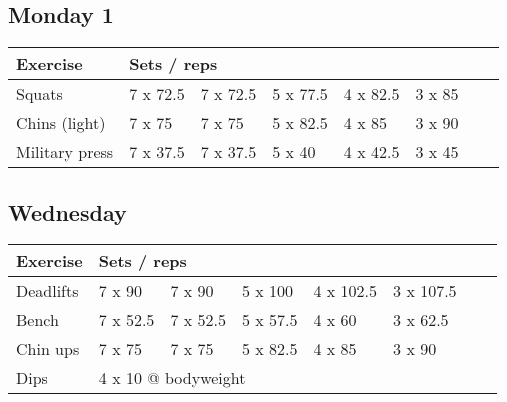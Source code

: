 \documentclass[12pt, a4paper]{article}%
\begin{document}
  \subsection*{\hspace{0.5em} Monday 1 }


  \begin{tabular}{l|lllllll}
  \hspace{0.75em} \textbf{Exercise} & \multicolumn{ 7 }{l}{ \textbf{Sets / reps} } \\ \hline

            \hspace{0.75em} Squats
            & 7 x 72.5
            & 7 x 72.5
            & 5 x 77.5
            & 4 x 82.5
            & 3 x 85
            & 
            & 
            \\


            \hspace{0.75em} Chins (light)
            & 7 x 75
            & 7 x 75
            & 5 x 82.5
            & 4 x 85
            & 3 x 90
            & 
            & 
            \\


            \hspace{0.75em} Military press
            & 7 x 37.5
            & 7 x 37.5
            & 5 x 40
            & 4 x 42.5
            & 3 x 45
            & 
            & 
            \\


  \end{tabular}

  \subsection*{\hspace{0.5em} Wednesday }


  \begin{tabular}{l|lllllll}
  \hspace{0.75em} \textbf{Exercise} & \multicolumn{ 7 }{l}{ \textbf{Sets / reps} } \\ \hline

            \hspace{0.75em} Deadlifts
            & 7 x 90
            & 7 x 90
            & 5 x 100
            & 4 x 102.5
            & 3 x 107.5
            & 
            & 
            \\


            \hspace{0.75em} Bench
            & 7 x 52.5
            & 7 x 52.5
            & 5 x 57.5
            & 4 x 60
            & 3 x 62.5
            & 
            & 
            \\


            \hspace{0.75em} Chin ups
            & 7 x 75
            & 7 x 75
            & 5 x 82.5
            & 4 x 85
            & 3 x 90
            & 
            & 
            \\


   \hspace{0.75em} Dips &  \multicolumn{ 7 }{l}{ 4 x 10 @ bodyweight } \\
  \end{tabular}
\end{document}
